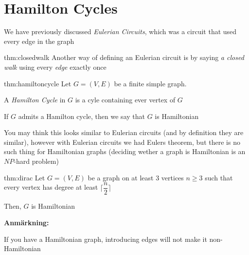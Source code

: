 \section{Hamilton Cycles}
\par\bigskip
\noindent We have previously discussed \textit{Eulerian Circuits}, which was a circuit that used every edge in the graph
\par\bigskip
\begin{theo}{thm:closedwalk}
  Another way of defining an Eulerian circuit is by saying \textit{a closed walk} using every \textit{edge} exactly once
\end{theo}
\par\bigskip
\begin{theo}{thm:hamiltoncycle}
  Let $G = (V,E)$ be a finite simple graph.
  \par\bigskip
  \noindent A \textit{Hamilton Cycle} in $G$ is a cyle containing ever vertex of $G$
  \par\bigskip
  \noindent If $G$ admits a Hamilton cycle, then we say that $G$ is Hamiltonian 
\end{theo}
\par\bigskip
\noindent You may think this looks similar to Eulerian circuits (and by definition they are similar), however with Eulerian circuits we had Eulers theorem, but there is no such thing for Hamiltonian graphs (deciding wether a graph is Hamiltonian is an $NP$-hard problem)
\par\bigskip
\begin{theo}[Dirac]{thm:dirac}
  Let $G = (V,E)$ be a graph on at least 3 vertices $n\geq3$ such that every vertex has degree at least $\lceil\dfrac{n}{2}\rceil$ 
  \par\bigskip
  \noindent Then, $G$ is Hamiltonian
\end{theo}
\par\bigskip
\noindent\textbf{Anmärkning:}\par
\noindent If you have a Hamiltonian graph, introducing edges will not make it non-Hamiltonian
\par\bigskip

